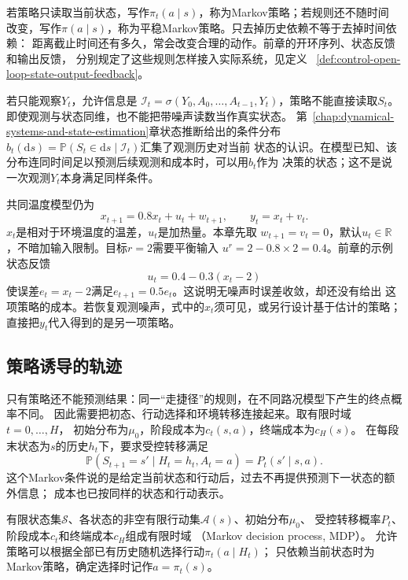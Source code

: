 若策略只读取当前状态，写作$\pi_t(a\mid s)$，称为Markov策略；若规则还不随时间
改变，写作$\pi(a\mid s)$，称为平稳Markov策略。只去掉历史依赖不等于去掉时间依赖：
距离截止时间还有多久，常会改变合理的动作。前章的开环序列、状态反馈和输出反馈，
分别规定了这些规则怎样接入实际系统，见定义
~\ref{def:control-open-loop-state-output-feedback}。

若只能观察$Y_t$，允许信息是
$\mathcal I_t=\sigma(Y_0,A_0,\ldots,A_{t-1},Y_t)$，策略不能直接读取$S_t$。
即使观测与状态同维，也不能把带噪声读数当作真实状态。
第~\ref{chap:dynamical-systems-and-state-estimation}章状态推断给出的条件分布
$b_t(\mathrm ds)=\mathbb P(S_t\in\mathrm ds\mid\mathcal I_t)$汇集了观测历史对当前
状态的认识。在模型已知、该分布连同时间足以预测后续观测和成本时，可以用$b_t$作为
决策的状态；这不是说一次观测$Y_t$本身满足同样条件。

共同温度模型仍为
\begin{equation}
  x_{t+1}=0.8x_t+u_t+w_{t+1},
  \qquad y_t=x_t+v_t.
  \label{eq:policy-temperature-model}
\end{equation}
$x_t$是相对于环境温度的温差，$u_t$是加热量。本章先取
$w_{t+1}=v_t=0$，默认$u_t\in\mathbb R$，不暗加输入限制。目标$r=2$需要平衡输入
$u^r=2-0.8\times2=0.4$。前章的示例状态反馈
\begin{equation}
  u_t=0.4-0.3(x_t-2)
  \label{eq:policy-temperature-feedback}
\end{equation}
使误差$e_t=x_t-2$满足$e_{t+1}=0.5e_t$。这说明无噪声时误差收敛，却还没有给出
这项策略的成本。若恢复观测噪声，式中的$x_t$须可见，或另行设计基于估计的策略；
直接把$y_t$代入得到的是另一项策略。

\subsection{策略诱导的轨迹}
\label{sec:policy-induced-trajectories}

只有策略还不能预测结果：同一“走捷径”的规则，在不同路况模型下产生的终点概率不同。
因此需要把初态、行动选择和环境转移连接起来。取有限时域$t=0,\ldots,H$，
初始分布为$\mu_0$，阶段成本为$c_t(s,a)$，终端成本为$c_H(s)$。
在每段末状态为$s$的历史$h_t$下，要求受控转移满足
\[
  \mathbb P(S_{t+1}=s'\mid H_t=h_t,A_t=a)=P_t(s'\mid s,a).
\]
这个Markov条件说的是给定当前状态和行动后，过去不再提供预测下一状态的额外信息；
成本也已按同样的状态和行动表示。

\begin{definition}[有限Markov决策过程与策略]
\label{def:decision-finite-mdp-policy}
有限状态集$\mathcal S$、各状态的非空有限行动集$\mathcal A(s)$、初始分布$\mu_0$、
受控转移概率$P_t$、阶段成本$c_t$和终端成本$c_H$组成有限时域
（Markov decision process, MDP）。
允许策略可以根据全部已有历史随机选择行动$\pi_t(a\mid H_t)$；
只依赖当前状态时为Markov策略，确定选择时记作$a=\pi_t(s)$。
\end{definition}

